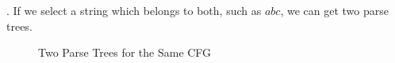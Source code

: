 \begin{problem}{1}
\begin{solution}
    . If we select a string which belongs to both, such as $abc$, we can get two parse trees.
    \begin{figure}[H]
      \centering
      \caption{Two Parse Trees for the Same CFG}
    \end{figure}
  \end{solution}
\end{problem}

